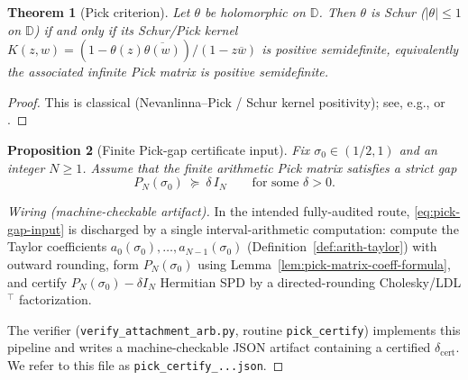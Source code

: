 \documentclass[11pt]{article}
\providecommand{\PickGapArtifact}{\texttt{pick\_certify\_...json}}
\newtheorem{theorem}{Theorem}
\newtheorem{proposition}[theorem]{Proposition}
\theoremstyle{definition}
\theoremstyle{remark}
\theoremstyle{definition}
\begin{document}
\begin{theorem}[Pick criterion]\label{thm:pick-criterion}
Let $\theta$ be holomorphic on $\mathbb D$.
Then $\theta$ is Schur ($|\theta|\le 1$ on $\mathbb D$) if and only if its Schur/Pick kernel
$K(z,w)=(1-\theta(z)\overline{\theta(w)})/(1-z\overline w)$ is positive semidefinite, equivalently the associated infinite Pick matrix is positive semidefinite.
\end{theorem}
\begin{proof}
This is classical (Nevanlinna--Pick / Schur kernel positivity); see, e.g., \cite[Ch.~2]{RosenblumRovnyak} or \cite[Ch.~III]{Donoghue}.
\end{proof}

\begin{proposition}[Finite Pick-gap certificate input]\label{prop:pick-gap-06}
Fix $\sigma_0\in(1/2,1)$ and an integer $N\ge 1$.
Assume that the finite arithmetic Pick matrix satisfies a strict gap
\begin{equation}\label{eq:pick-gap-input}
  P_N(\sigma_0)\ \succeq\ \delta\,I_N
  \qquad\text{for some }\delta>0.
\end{equation}
\end{proposition}
\begin{proof}[Wiring (machine-checkable artifact)]
In the intended fully-audited route, \eqref{eq:pick-gap-input} is discharged by a single interval-arithmetic computation:
compute the Taylor coefficients $a_0(\sigma_0),\dots,a_{N-1}(\sigma_0)$ (Definition~\ref{def:arith-taylor}) with outward rounding,
form $P_N(\sigma_0)$ using Lemma~\ref{lem:pick-matrix-coeff-formula},
and certify $P_N(\sigma_0)-\delta I_N$ Hermitian SPD by a directed-rounding Cholesky/LDL$^\top$ factorization.

\medskip
\noindent The verifier (\texttt{verify\_attachment\_arb.py}, routine \texttt{pick\_certify}) implements this pipeline and writes a machine-checkable JSON artifact containing a certified $\delta_{\mathrm{cert}}$.
We refer to this file as \PickGapArtifact.
\end{proof}
\end{document}
